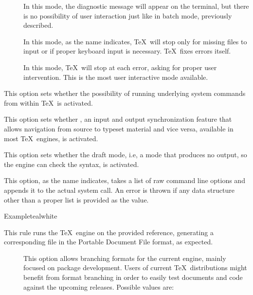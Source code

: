 \begin{description}
\begin{description}
\begin{description}
\item[] In this mode, the diagnostic message will appear on the terminal, but there is no possibility of user interaction just like in batch mode, previously described.

\item[] In this mode, as the name indicates, \TeX\ will stop only for missing files to input or if proper keyboard input is necessary. \TeX\ fixes errors itself.

\item[] In this mode, \TeX\ will stop at each error, asking for proper user intervention. This is the most user interactive mode available.
\end{description}

\item[\rpsbox{shell}] This option sets whether the possibility of running underlying system commands from within \TeX\ is activated.

\item[\rpsbox{synctex}] This option sets whether , an input and output synchronization feature that allows navigation from source to typeset material and vice versa, available in most \TeX\ engines, is activated.

\item[\rpsbox{draft}] This option sets whether the draft mode, i.e, a mode that produces no output, so the engine can check the syntax, is activated.

\item[\abox{options}] This option, as the name indicates, takes a list of raw command line options and appends it to the actual system call. An error is thrown if any data structure other than a proper list is provided as the value.
\end{description}

\begin{codebox}{Example}{teal}{\icnote}{white}
\end{codebox}

\item[\rulebox{pdflatex}]
This rule runs the  \TeX\ engine on the provided  reference, generating a corresponding file in the Portable Document File format, as expected.

\begin{description}
\item[] This option allows branching formats for the current engine, mainly focused on package development. Users of current \TeX\ distributions might benefit from format branching in order to easily test documents and code against the upcoming releases. Possible values are:


\end{description}
\end{description}
